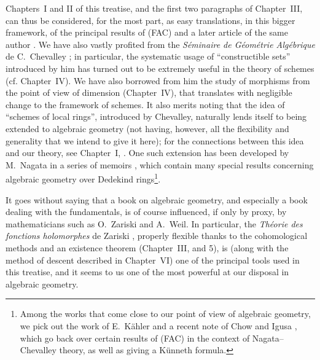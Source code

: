 Chapters~I and II of this treatise, and the first two paragraphs of Chapter~III,
can thus be considered, for the most part, as easy translations, in this bigger
framework, of the principal results of (FAC) and a later article of the same
author \cite{I-15}. We have also vastly profited from the {\em S\'eminaire de
G\'eom\'etrie Alg\'ebrique} de C.~Chevalley \cite{I-1}; in particular, the
systematic usage of ``constructible sets'' introduced by him has turned out to
be extremely useful in the theory of schemes (cf. Chapter~IV). We have also
borrowed from him the study of morphisms from
the point of view of dimension (Chapter~IV), that translates with negligible
change to the framework of schemes. It also merits noting that the idea of
``schemes of local rings'', introduced by Chevalley, naturally lends itself to
being extended to algebraic geometry (not having, however, all the flexibility
and generality that we intend to give it here); for the connections between this
idea and our theory, see Chapter~I, . One such extension has been
developed by M.~Nagata in a series of memoirs \cite{I-9}, which contain many
special results concerning algebraic geometry over Dedekind
rings\footnote{Among the works that come close to our point of view of
algebraic geometry, we pick out the work of E.~K\"ahler \cite{I-22} and a recent
note of Chow and Igusa \cite{I-3}, which go back over certain results of (FAC) in
the context of Nagata--Chevalley theory, as well as giving a K\"unneth
formula.}.

\sectionbreak

It goes without saying that a book on algebraic geometry, and especially a book
dealing with the fundamentals, is of course influenced, if only by proxy, by
mathematicians such as O.~Zariski and A.~Weil. In particular, the
{\em Th\'eorie des fonctions holomorphes} de Zariski \cite{I-20}, properly
flexible thanks to the cohomological methods and an existence theorem
(Chapter~III, \textsection{} and 5), is (along with the method of
descent described in Chapter~VI) one of the principal tools used in this
treatise, and it seems to us one of the most powerful at our disposal in
algebraic geometry.

